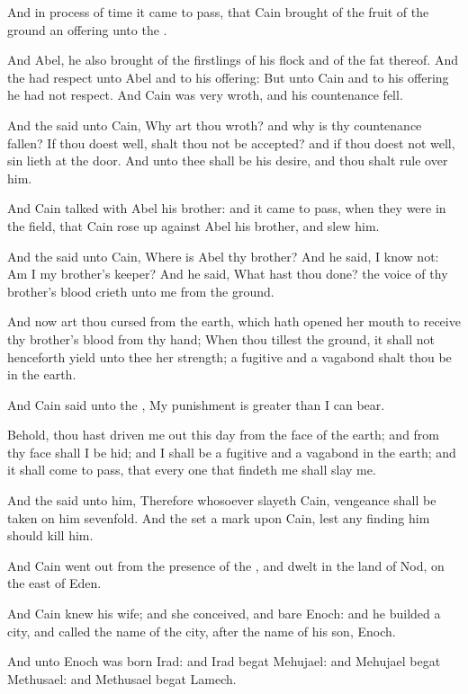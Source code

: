 \verse And in process of time it came to pass, that Cain brought of the fruit of the ground an offering unto the \LORD.

\verse And Abel, he also brought of the firstlings of his flock and of the fat thereof. And the \LORD had respect unto Abel and to his offering: \verse But unto Cain and to his offering he had not respect.  And Cain was very wroth, and his countenance fell.

\verse And the \LORD said unto Cain, Why art thou wroth? and why is thy countenance fallen?  \verse If thou doest well, shalt thou not be accepted? and if thou doest not well, sin lieth at the door. And unto thee shall be his desire, and thou shalt rule over him.

\verse And Cain talked with Abel his brother: and it came to pass, when they were in the field, that Cain rose up against Abel his brother, and slew him.

\verse And the \LORD said unto Cain, Where is Abel thy brother? And he said, I know not: Am I my brother's keeper?  \verse And he said, What hast thou done? the voice of thy brother's blood crieth unto me from the ground.

\verse And now art thou cursed from the earth, which hath opened her mouth to receive thy brother's blood from thy hand; \verse When thou tillest the ground, it shall not henceforth yield unto thee her strength; a fugitive and a vagabond shalt thou be in the earth.

\verse And Cain said unto the \LORD, My punishment is greater than I can bear.

\verse Behold, thou hast driven me out this day from the face of the earth; and from thy face shall I be hid; and I shall be a fugitive and a vagabond in the earth; and it shall come to pass, that every one that findeth me shall slay me.

\verse And the \LORD said unto him, Therefore whosoever slayeth Cain, vengeance shall be taken on him sevenfold. And the \LORD set a mark upon Cain, lest any finding him should kill him.

\verse And Cain went out from the presence of the \LORD, and dwelt in the land of Nod, on the east of Eden.

\verse And Cain knew his wife; and she conceived, and bare Enoch: and he builded a city, and called the name of the city, after the name of his son, Enoch.

\verse And unto Enoch was born Irad: and Irad begat Mehujael: and Mehujael begat Methusael: and Methusael begat Lamech.

